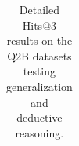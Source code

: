 \begin{table}[!htp]
\begin{tabular*}{\linewidth}{@{}cccccccccccc@{}}
\bottomrule
\end{tabular*}
\caption{Detailed Hits@3 results on the Q2B datasets testing generalization and deductive reasoning.}
\label{table_9}
\end{table}

